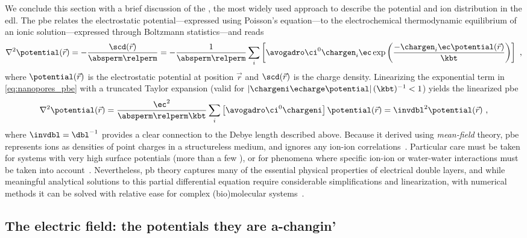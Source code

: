 We conclude this section with a brief discussion of the , the most widely used approach to
describe the potential and ion distribution in the \gls{edl}. The \gls{pbe} relates the electrostatic
potential---expressed using Poisson's equation---to the electrochemical thermodynamic equilibrium of an ionic
solution---expressed through Boltzmann statistics---and reads~\cite{Gouy-1910,Chapman-1913,Baker-2005}
%
\begin{equation}\label{eq:nanopores_pbe}
  \nabla^2 \potential(\vec{r}) = - \dfrac{\scd(\vec{r})}{\absperm \relperm}
  = - \dfrac{1}{\absperm \relperm}
  \sum_i \left[ \avogadro \ci^0 \chargen_i \ec
         \exp \left( \dfrac{-\chargen_i \ec \potential(\vec{r}) }{\kbt} \right)
        \right]
  \text{ ,}
\end{equation}
%
where $\potential(\vec{r})$ is the electrostatic potential at position $\vec{r}$ and $\scd(\vec{r})$ is the
charge density. Linearizing the exponential term in \cref{eq:nanopores_pbe} with a truncated Taylor expansion
(valid for $\left| \chargeni \echarge \potential \right| (\kbt)^{-1} < 1$) yields the linearized \gls{pbe}
%
\begin{equation}\label{eq:nanopores_pbe_linear}
  \nabla^2 \potential(\vec{r})
  = \dfrac{\ec^2}{\absperm \relperm \kbt} \sum_i \left[ \avogadro \ci^0 \chargeni \right]
      \potential(\vec{r})
  = \invdbl^2 \potential(\vec{r})
  \text{ ,}
\end{equation}
%
where $\invdbl = \dbl^{-1}$ provides a clear connection to the Debye length described above. Because it
derived using \emph{mean-field} theory, \gls{pbe} represents ions as densities of point charges in a
structureless medium, and ignores any ion-ion correlations~\cite{Bocquet-2010}. Particular care must be taken
for systems with very high surface potentials (more than a few \si{\kTe}), or for phenomena where specific
ion-ion or water-water interactions must be taken into account~\cite{Collins-2012}. Nevertheless, \gls{pb}
theory captures many of the essential physical properties of electrical double layers, and while meaningful
analytical solutions to this partial differential equation require considerable simplifications and
linearization, with numerical methods it can be solved with relative ease for complex (bio)molecular
systems~\cite{Baker-2001,Baker-2005}.


\subsection{The electric field: the potentials they are a-changin'}
%
\label{sec:np:potential}
%

